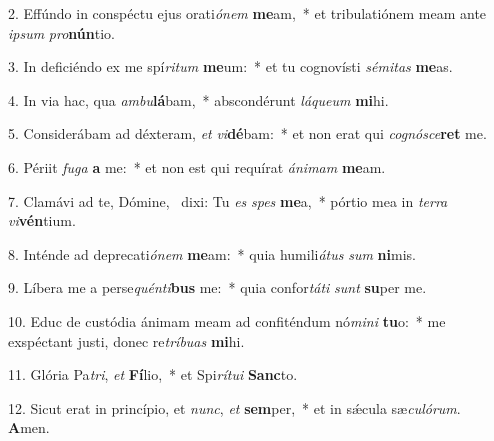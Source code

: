 2. Effúndo in conspéctu ejus orati\textit{ó}\textit{nem} \textbf{me}am,~*  et tribulatiónem meam ante \textit{ip}\textit{sum} \textit{pro}\textbf{nún}tio.\

3. In deficiéndo ex me spí\textit{ri}\textit{tum} \textbf{me}um:~*  et tu cognovísti \textit{sé}\textit{mi}\textit{tas} \textbf{me}as.\

4. In via hac, qua \textit{am}\textit{bu}\textbf{lá}bam,~*  abscondérunt \textit{lá}\textit{que}\textit{um} \textbf{mi}hi.\

5. Considerábam ad déxteram, \textit{et} \textit{vi}\textbf{dé}bam:~*  et non erat qui \textit{co}\textit{gnó}\textit{sce}\textbf{ret} me.\

6. Périit \textit{fu}\textit{ga} \textbf{a} me:~*  et non est qui requírat \textit{á}\textit{ni}\textit{mam} \textbf{me}am.\

7. Clamávi ad te, Dómine, \dag\  dixi: Tu \textit{es} \textit{spes} \textbf{me}a,~*  pórtio mea in \textit{ter}\textit{ra} \textit{vi}\textbf{vén}tium.\

8. Inténde ad deprecati\textit{ó}\textit{nem} \textbf{me}am:~*  quia humili\textit{á}\textit{tus} \textit{sum} \textbf{ni}mis.\

9. Líbera me a perse\textit{quén}\textit{ti}\textbf{bus} me:~*  quia confor\textit{tá}\textit{ti} \textit{sunt} \textbf{su}per me.\

10. Educ de custódia ánimam meam ad confiténdum nó\textit{mi}\textit{ni} \textbf{tu}o:~*  me exspéctant justi, donec re\textit{trí}\textit{bu}\textit{as} \textbf{mi}hi.\

11. Glória Pa\textit{tri}, \textit{et} \textbf{Fí}lio,~*  et Spi\textit{rí}\textit{tu}\textit{i} \textbf{Sanc}to.\

12. Sicut erat in princípio, et \textit{nunc}, \textit{et} \textbf{sem}per,~*  et in sǽcula sæ\textit{cu}\textit{ló}\textit{rum}. \textbf{A}men.\

